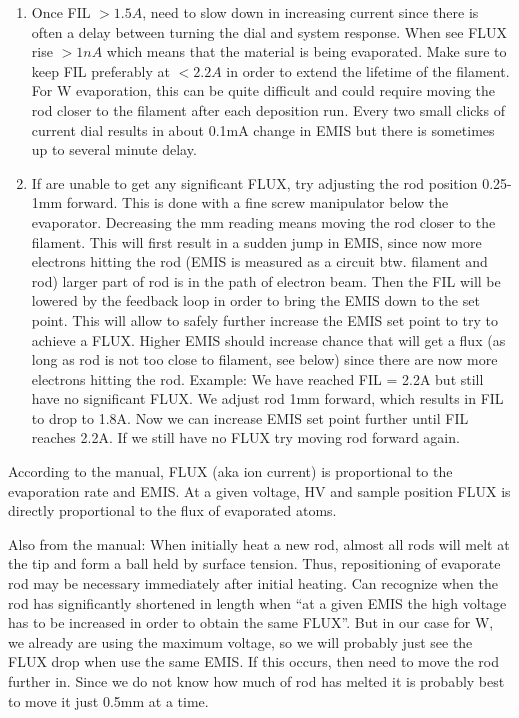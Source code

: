 \begin{enumerate}
\item	Once FIL $>1.5A$, need to slow down in increasing current since there is often a delay between turning the dial and system response. When see FLUX rise $>1nA$ which means that the material is being evaporated. Make sure to keep FIL preferably at $<2.2A$ in order to extend the lifetime of the filament. For W evaporation, this can be quite difficult and could require moving the rod closer to the filament after each deposition run. Every two small clicks of current dial results in about 0.1mA change in EMIS but there is sometimes up to several minute delay.
\item	If are unable to get any significant FLUX, try adjusting the rod position 0.25-1mm forward. This is done with a fine screw manipulator below the evaporator. Decreasing the mm reading means moving the rod closer to the filament. This will first result in a sudden jump in EMIS, since now more electrons hitting the rod (EMIS is measured as a circuit btw. filament and rod) larger part of rod is in the path of electron beam. Then the FIL will be lowered by the feedback loop in order to bring the EMIS down to the set point. This will allow to safely further increase the EMIS set point to try to achieve a FLUX. Higher EMIS should increase chance that will get a flux (as long as rod is not too close to filament, see below) since there are now more electrons hitting the rod.
Example: We have reached FIL = 2.2A but still have no significant FLUX. We adjust rod 1mm forward, which results in FIL to drop to 1.8A. Now we can increase EMIS set point further until FIL reaches 2.2A. If we still have no FLUX try moving rod forward again.

\end{enumerate}
According to the manual, FLUX (aka ion current) is proportional to the evaporation rate and EMIS. At a given voltage, HV and sample position FLUX is directly proportional to the flux of evaporated atoms.

Also from the manual:
When initially heat a new rod, almost all rods will melt at the tip and form a ball held by surface tension. Thus, repositioning of evaporate rod may be necessary immediately after initial heating.
Can recognize when the rod has significantly shortened in length when “at a given EMIS the high voltage has to be increased in order to obtain the same FLUX”. But in our case for W, we already are using the maximum voltage, so we will probably just see the FLUX drop when use the same EMIS. If this occurs, then need to move the rod further in. Since we do not know how much of rod has melted it is probably best to move it just 0.5mm at a time.

